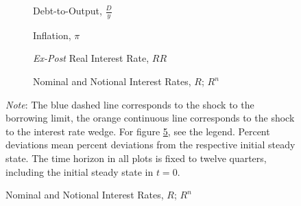 \documentclass[a4paper,12pt]{article} %
\numberwithin{equation}{section} %
\numberwithin{figure}{section}
\numberwithin{table}{section}
\begin{document}
\begin{refsection}
\begin{appendices}
\begin{figure}[H]
    \caption{Supplement for Figure \ref{fig:baseline-permanent-wedge-agg}}
    \label{fig:baseline-permanent-wedge-agg-extra}
    \begin{subfigure}[b]{0.49\textwidth}
     \caption{Debt-to-Output, $\frac{D}{y}$}
     \label{fig:baseline-permanent-wedge-agg-DY}
         \centering
         
     \end{subfigure}
     \vspace{5pt}
     \hfill
     \begin{subfigure}[b]{0.49\textwidth}
     \centering
     \caption{Inflation, $\pi$}
     \label{fig:baseline-permanent-wedge-agg-pi}
         
     \end{subfigure}
     \vspace{5pt}
     \hfill
    \begin{subfigure}[b]{0.49\textwidth}
     \caption{\textit{Ex-Post} Real Interest Rate, $RR$}
     \label{fig:baseline-permanent-wedge-agg-Rr}
         \centering
         
     \end{subfigure}
     \hfill
     \begin{subfigure}[b]{0.49\textwidth}
     \caption{Nominal and Notional Interest Rates, $R$; $R^n$}
     \label{fig:baseline-permanent-wedge-agg-Rn}
         \centering
         
     \end{subfigure}

     \vspace{5pt}

     \begin{minipage}{\textwidth} 
    \footnotesize
    \textit{Note}: The blue dashed line corresponds to the shock to the borrowing limit, the orange continuous line corresponds to the shock to the interest rate wedge. For figure \ref{fig:baseline-permanent-wedge-agg-Rn}, see the legend. Percent deviations mean percent deviations from the respective initial steady state. The time horizon in all plots is fixed to twelve quarters, including the initial steady state in $t=0$.
	\end{minipage}
\end{figure}


\end{appendices}
\end{refsection}
\end{document}
